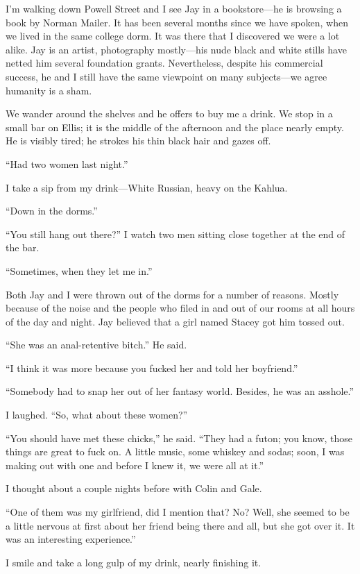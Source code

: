 I'm walking down Powell Street and I see Jay in a bookstore---he is
browsing a book by Norman Mailer. It has been several months since we
have spoken, when we lived in the same college dorm. It was there that I
discovered we were a lot alike. Jay is an artist, photography
mostly---his nude black and white stills have netted him several
foundation grants. Nevertheless, despite his commercial success, he and
I still have the same viewpoint on many subjects---we agree humanity is
a sham.

We wander around the shelves and he offers to buy me a drink. We stop in
a small bar on Ellis; it is the middle of the afternoon and the place
nearly empty. He is visibly tired; he strokes his thin black hair and
gazes off.

``Had two women last night.''

I take a sip from my drink---White Russian, heavy on the Kahlua.

``Down in the dorms.''

``You still hang out there?'' I watch two men sitting close together at
the end of the bar.

``Sometimes, when they let me in.''

Both Jay and I were thrown out of the dorms for a number of reasons.
Mostly because of the noise and the people who filed in and out of our
rooms at all hours of the day and night. Jay believed that a girl named
Stacey got him tossed out.

``She was an anal-retentive bitch.'' He said.

``I think it was more because you fucked her and told her boyfriend.''

``Somebody had to snap her out of her fantasy world. Besides, he was an
asshole.''

I laughed. ``So, what about these women?''

``You should have met these chicks,'' he said. ``They had a futon; you
know, those things are great to fuck on. A little music, some whiskey
and sodas; soon, I was making out with one and before I knew it, we were
all at it.''

I thought about a couple nights before with Colin and Gale.

``One of them was my girlfriend, did I mention that? No? Well, she
seemed to be a little nervous at first about her friend being there and
all, but she got over it. It was an interesting experience.''

I smile and take a long gulp of my drink, nearly finishing it.

